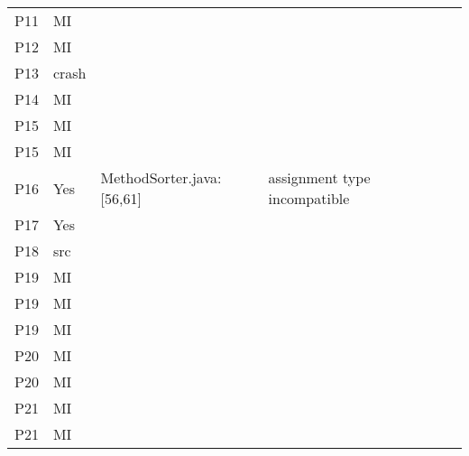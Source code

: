 \begin{table}[]
\begin{tabular}{|p{1.5cm}|p{1cm}|p{3cm}|p{4cm}|p{2cm}|p{1.5cm}|}
        P11 & MI &  &  &  &  \\
        P12 & MI &  &  &  &  \\
        P13 & crash &  &  &  &  \\
        P14 & MI &  &  &  &  \\
        P15 & MI &  &  &  &  \\
        P15 & MI &  &  &  &  \\
        P16 & Yes & MethodSorter.java: [56,61]  & assignment type incompatible &  &  \\
        P17 & Yes &  &  &  &  \\
        P18 & src &  &  &  &  \\
        P19 & MI &  &  &  &  \\
        P19 & MI &  &  &  &  \\
        P19 & MI &  &  &  &  \\
        P20 & MI &  &  &  &  \\
        P20 & MI &  &  &  &  \\
        P21 & MI &  &  &  &  \\
        P21 & MI &  &  &  &  \\ \hline
    \end{tabular}
\end{table}
